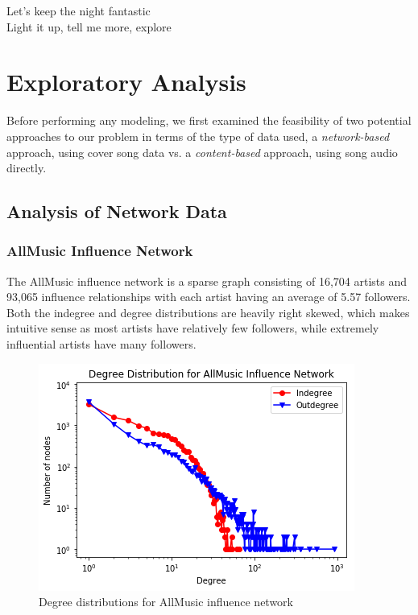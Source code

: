 \begin{savequote}[75mm] 
Let’s keep the night fantastic\\
Light it up, tell me more, explore
\end{savequote}

\chapter{Exploratory Analysis}
Before performing any modeling, we first examined the feasibility of two potential approaches to our problem in terms of the type of data used, a \textit{network-based} approach, using cover song data vs. a \textit{content-based} approach, using song audio directly.

\section{Analysis of Network Data}
\subsection{AllMusic Influence Network}
The AllMusic influence network is a sparse graph consisting of 16,704 artists and 93,065 influence relationships with each artist having an average of 5.57 followers. Both the indegree and degree distributions are heavily right skewed, which makes intuitive sense as most artists have relatively few followers, while extremely influential artists have many followers.

\begin{figure}[H]
\includegraphics[width=\textwidth]{figures/allmusic_degree_distribution.png}
\caption{Degree distributions for AllMusic influence network}
\end{figure}

